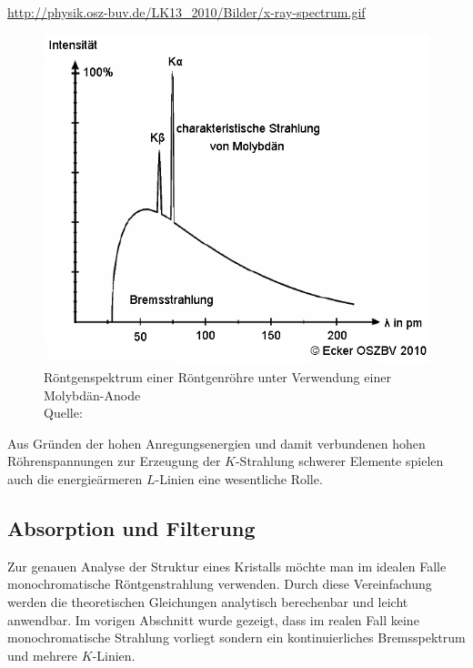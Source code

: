 			\url{http://physik.osz-buv.de/LK13_2010/Bilder/x-ray-spectrum.gif}
			\begin{figure}[htb]
				\centering
				\includegraphics[scale = 0.55]{images/linienspec.png}
				\caption{Röntgenspektrum einer Röntgenröhre unter Verwendung einer Molybdän-Anode \\ Quelle: }
				\label{fig:brems-spektrum}
			\end{figure}

			Aus Gründen der hohen Anregungsenergien und damit verbundenen hohen Röhrenspannungen zur Erzeugung der $K$-Strahlung schwerer Elemente spielen auch die energieärmeren $L$-Linien eine wesentliche Rolle.


		\subsection{Absorption und Filterung}
		\label{ssec:filterung}
		
			Zur genauen Analyse der Struktur eines Kristalls möchte man im idealen Falle monochromatische Röntgenstrahlung verwenden.
			Durch diese Vereinfachung werden die theoretischen Gleichungen analytisch berechenbar und leicht anwendbar.
			Im vorigen Abschnitt wurde gezeigt, dass im realen Fall keine monochromatische Strahlung vorliegt sondern ein kontinuierliches Bremsspektrum und mehrere $K$-Linien.

